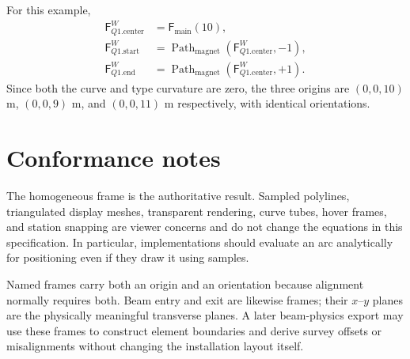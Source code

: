 \documentclass[11pt,a4paper]{article}
\newcommand{\Frame}{\mathsf{F}}
\newcommand{\Path}{\operatorname{Path}}
\begin{document}
For this example,
\begin{align*}
 \Frame_{Q1.\mathrm{center}}^W&=\Frame_{\mathrm{main}}(10),\\
 \Frame_{Q1.\mathrm{start}}^W
   &=\Path_{\mathrm{magnet}}(\Frame_{Q1.\mathrm{center}}^W,-1),\\
 \Frame_{Q1.\mathrm{end}}^W
   &=\Path_{\mathrm{magnet}}(\Frame_{Q1.\mathrm{center}}^W,+1).
\end{align*}
Since both the curve and type curvature are zero, the three origins are
$(0,0,10)$ m, $(0,0,9)$ m, and $(0,0,11)$ m respectively, with identical
orientations.

\section{Conformance notes}

The homogeneous frame is the authoritative result.  Sampled polylines,
triangulated display meshes, transparent rendering, curve tubes, hover frames,
and station snapping are viewer concerns and do not change the equations in
this specification.  In particular, implementations should evaluate an arc
analytically for positioning even if they draw it using samples.

Named frames carry both an origin and an orientation because alignment normally
requires both.  Beam entry and exit are likewise frames;
their $x$--$y$ planes are the physically meaningful transverse planes.  A later
beam-physics export may use these frames to construct element boundaries and
derive survey offsets or misalignments without changing the installation
layout itself.
\end{document}
